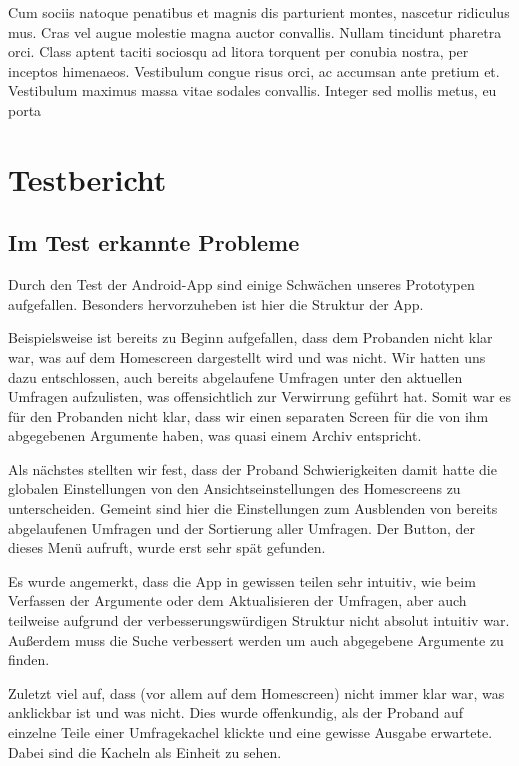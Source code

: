 Cum sociis natoque penatibus et magnis dis parturient montes, nascetur ridiculus mus. Cras vel augue molestie magna auctor convallis. Nullam tincidunt pharetra orci. Class aptent taciti sociosqu ad litora torquent per conubia nostra, per inceptos himenaeos. Vestibulum congue risus orci, ac accumsan ante pretium et. Vestibulum maximus massa vitae sodales convallis. Integer sed mollis metus, eu porta

\section{Testbericht}
\label{sec:testbericht}

\subsection{Im Test erkannte Probleme}
\label{sec:foundproblemes}

Durch den Test der Android-App sind einige Schwächen unseres Prototypen aufgefallen. Besonders hervorzuheben ist hier die Struktur der App.

Beispielsweise ist bereits zu Beginn aufgefallen, dass dem Probanden nicht klar war, was auf dem Homescreen dargestellt wird und was nicht. Wir hatten uns dazu entschlossen, auch bereits abgelaufene Umfragen unter den aktuellen Umfragen aufzulisten, was offensichtlich zur Verwirrung geführt hat. Somit war es für den Probanden nicht klar, dass wir einen separaten Screen für die von ihm abgegebenen Argumente haben, was quasi einem Archiv entspricht.

Als nächstes stellten wir fest, dass der Proband Schwierigkeiten damit hatte die globalen Einstellungen von den Ansichtseinstellungen des Homescreens zu unterscheiden. Gemeint sind hier die Einstellungen zum Ausblenden von bereits abgelaufenen Umfragen und der Sortierung aller Umfragen. Der Button, der dieses Menü aufruft, wurde erst sehr spät gefunden.

Es wurde angemerkt, dass die App in gewissen teilen sehr intuitiv, wie beim Verfassen der Argumente oder dem Aktualisieren der Umfragen, aber auch teilweise aufgrund der verbesserungswürdigen Struktur nicht absolut intuitiv war.
Außerdem muss die Suche verbessert werden um auch abgegebene Argumente zu finden.

Zuletzt viel auf, dass (vor allem auf dem Homescreen) nicht immer klar war, was anklickbar ist und was nicht. Dies wurde offenkundig, als der Proband auf einzelne Teile einer Umfragekachel klickte und eine gewisse Ausgabe erwartete. Dabei sind die Kacheln als Einheit zu sehen.


